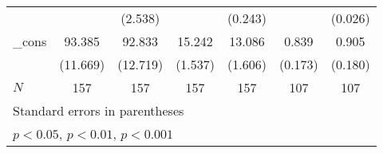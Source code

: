 {\begin{tabular}{l*{6}{c}}
            &                     &     (2.538)         &                     &     (0.243)         &                     &     (0.026)         \\
[1em]
\_cons      &      93.385\sym{***}&      92.833\sym{***}&      15.242\sym{***}&      13.086\sym{***}&       0.839\sym{***}&       0.905\sym{***}\\
            &    (11.669)         &    (12.719)         &     (1.537)         &     (1.606)         &     (0.173)         &     (0.180)         \\
\hline
\(N\)       &         157         &         157         &         157         &         157         &         107         &         107         \\
\hline\hline
\multicolumn{7}{l}{\footnotesize Standard errors in parentheses}\\
\multicolumn{7}{l}{\footnotesize \sym{*} \(p<0.05\), \sym{**} \(p<0.01\), \sym{***} \(p<0.001\)}\\
\end{tabular}
}
